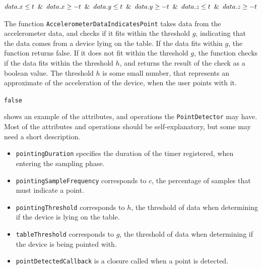 \begin{algorithm}
  \begin{algorithmic}
      \State \Return $data.x \leq t \And data.x \geq -t \And data.y \leq t \And data.y \geq -t \And data.z \leq t \And data.z \geq -t$
    \EndFunction
  \end{algorithmic}
\end{algorithm}

The function \texttt{AccelerometerDataIndicatesPoint} takes data from the accelerometer data, 
and checks if it fits within the threshold $g$, 
indicating that the data comes from a device lying on the table. 
If the data fits within $g$, 
the function returns false. 
If it does not fit within the threshold $g$, 
the function checks if the data fits within the threshold $h$, 
and returns the result of the check as a boolean value. 
The threshold $h$ is some small number, 
that represents an approximate of the acceleration of the device, 
when the user points with it.

\begin{algorithm}
  \begin{algorithmic}
    \State \Return \texttt{false}
    \Else
    \State \Return {}
    \EndIf
    \EndFunction
  \end{algorithmic}
\end{algorithm}

 shows an example of the attributes, 
and operations the \texttt{PointDetector} may have. 
Most of the attributes and operations should be self-explanatory, 
but some may need a short description.

\begin{itemize}
  \item \texttt{pointingDuration} specifies the duration of the timer registered, when entering the sampling phase.
  \item \texttt{pointingSampleFrequency} corresponds to $c$, the percentage of samples that must indicate a point.
  \item \texttt{pointingThreshold} corresponds to $h$, the threshold of data when determining if the device is lying on the table.
  \item \texttt{tableThreshold} corresponds to $g$, the threshold of data when determining if the device is being pointed with.
  \item \texttt{pointDetectedCallback} is a closure called when a point is detected.
\end{itemize}

